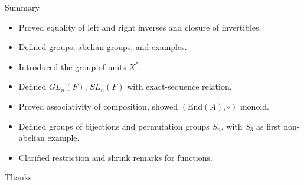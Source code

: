 \begin{frame}{Summary}
\begin{itemize}
  \item Proved equality of left and right inverses and closure of invertibles.
  \item Defined groups, abelian groups, and examples.
  \item Introduced the group of units \(X^*\).
  \item Defined \(GL_n(F)\), \(SL_n(F)\) with exact-sequence relation.
  \item Proved associativity of composition, showed \((\text{End}(A),\circ)\) monoid.
  \item Defined groups of bijections and permutation groups \(S_n\), with \(S_3\) as first non-abelian example.
  \item Clarified restriction and shrink remarks for functions.
\end{itemize}
\end{frame}

\begin{frame}{Thanks}
  \cmcendframe
\end{frame}


